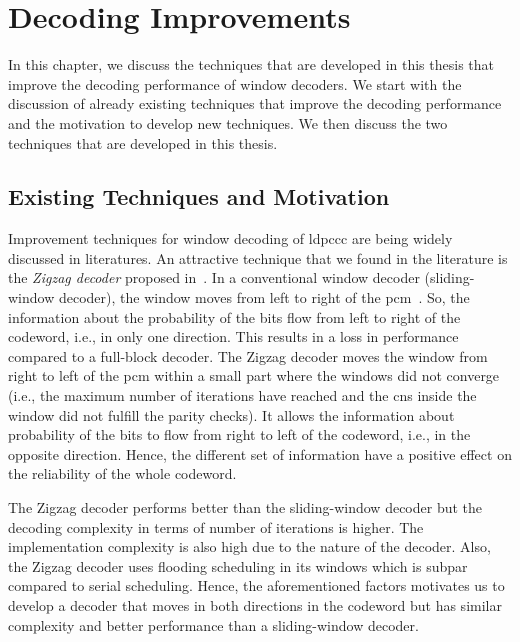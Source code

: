 \chapter{Decoding Improvements}\label{ch:dec_improve}
In this chapter, we discuss the techniques that are developed in this thesis that improve the decoding performance of window decoders. We start with the discussion of already existing techniques that improve the decoding performance and the motivation to develop new techniques. We then discuss the two techniques that are developed in this thesis.

\section{Existing Techniques and Motivation}
Improvement techniques for window decoding of \gls{ldpccc} are being widely discussed in literatures. An attractive technique that we found in the literature is the \emph{Zigzag decoder} proposed in~\cite{Shadi2015}. In a conventional window decoder (sliding-window decoder), the window moves from left to right of the \gls{pcm}~\cite{Iyengar2012}. So, the information about the probability of the bits flow from left to right of the codeword, i.e., in only one direction. This results in a loss in performance compared to a full-block decoder. The Zigzag decoder moves the window from right to left of the \gls{pcm} within a small part where the windows did not converge (i.e., the maximum number of iterations have reached and the \glspl{cn} inside the window did not fulfill the parity checks). It allows the information about probability of the bits to flow from right to left of the codeword, i.e., in the opposite direction. Hence, the different set of information have a positive effect on the reliability of the whole codeword.

The Zigzag decoder performs better than the sliding-window decoder but the decoding complexity in terms of number of iterations is higher. The implementation complexity is also high due to the nature of the decoder. Also, the Zigzag decoder uses flooding scheduling in its windows which is subpar compared to serial scheduling. Hence, the aforementioned factors motivates us to develop a decoder that moves in both directions in the codeword but has similar complexity and better performance than a sliding-window decoder.

